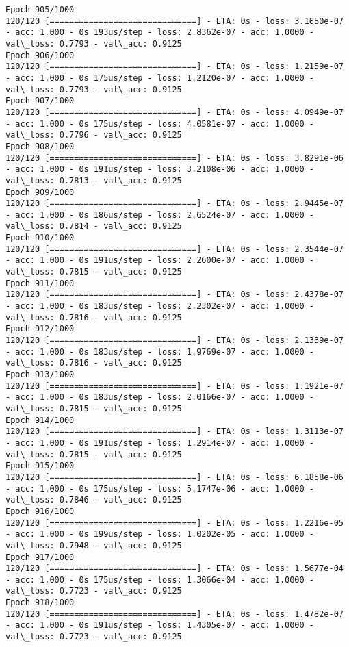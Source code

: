 \documentclass[11pt]{article}
\begin{document}
\begin{Verbatim}[commandchars=\\\{\}]
Epoch 905/1000
120/120 [==============================] - ETA: 0s - loss: 3.1650e-07 - acc: 1.000 - 0s 193us/step - loss: 2.8362e-07 - acc: 1.0000 - val\_loss: 0.7793 - val\_acc: 0.9125
Epoch 906/1000
120/120 [==============================] - ETA: 0s - loss: 1.2159e-07 - acc: 1.000 - 0s 175us/step - loss: 1.2120e-07 - acc: 1.0000 - val\_loss: 0.7793 - val\_acc: 0.9125
Epoch 907/1000
120/120 [==============================] - ETA: 0s - loss: 4.0949e-07 - acc: 1.000 - 0s 175us/step - loss: 4.0581e-07 - acc: 1.0000 - val\_loss: 0.7796 - val\_acc: 0.9125
Epoch 908/1000
120/120 [==============================] - ETA: 0s - loss: 3.8291e-06 - acc: 1.000 - 0s 191us/step - loss: 3.2108e-06 - acc: 1.0000 - val\_loss: 0.7813 - val\_acc: 0.9125
Epoch 909/1000
120/120 [==============================] - ETA: 0s - loss: 2.9445e-07 - acc: 1.000 - 0s 186us/step - loss: 2.6524e-07 - acc: 1.0000 - val\_loss: 0.7814 - val\_acc: 0.9125
Epoch 910/1000
120/120 [==============================] - ETA: 0s - loss: 2.3544e-07 - acc: 1.000 - 0s 191us/step - loss: 2.2600e-07 - acc: 1.0000 - val\_loss: 0.7815 - val\_acc: 0.9125
Epoch 911/1000
120/120 [==============================] - ETA: 0s - loss: 2.4378e-07 - acc: 1.000 - 0s 183us/step - loss: 2.2302e-07 - acc: 1.0000 - val\_loss: 0.7816 - val\_acc: 0.9125
Epoch 912/1000
120/120 [==============================] - ETA: 0s - loss: 2.1339e-07 - acc: 1.000 - 0s 183us/step - loss: 1.9769e-07 - acc: 1.0000 - val\_loss: 0.7816 - val\_acc: 0.9125
Epoch 913/1000
120/120 [==============================] - ETA: 0s - loss: 1.1921e-07 - acc: 1.000 - 0s 183us/step - loss: 2.0166e-07 - acc: 1.0000 - val\_loss: 0.7815 - val\_acc: 0.9125
Epoch 914/1000
120/120 [==============================] - ETA: 0s - loss: 1.3113e-07 - acc: 1.000 - 0s 191us/step - loss: 1.2914e-07 - acc: 1.0000 - val\_loss: 0.7815 - val\_acc: 0.9125
Epoch 915/1000
120/120 [==============================] - ETA: 0s - loss: 6.1858e-06 - acc: 1.000 - 0s 175us/step - loss: 5.1747e-06 - acc: 1.0000 - val\_loss: 0.7846 - val\_acc: 0.9125
Epoch 916/1000
120/120 [==============================] - ETA: 0s - loss: 1.2216e-05 - acc: 1.000 - 0s 199us/step - loss: 1.0202e-05 - acc: 1.0000 - val\_loss: 0.7948 - val\_acc: 0.9125
Epoch 917/1000
120/120 [==============================] - ETA: 0s - loss: 1.5677e-04 - acc: 1.000 - 0s 175us/step - loss: 1.3066e-04 - acc: 1.0000 - val\_loss: 0.7723 - val\_acc: 0.9125
Epoch 918/1000
120/120 [==============================] - ETA: 0s - loss: 1.4782e-07 - acc: 1.000 - 0s 191us/step - loss: 1.4305e-07 - acc: 1.0000 - val\_loss: 0.7723 - val\_acc: 0.9125

\end{Verbatim}
\end{document}
